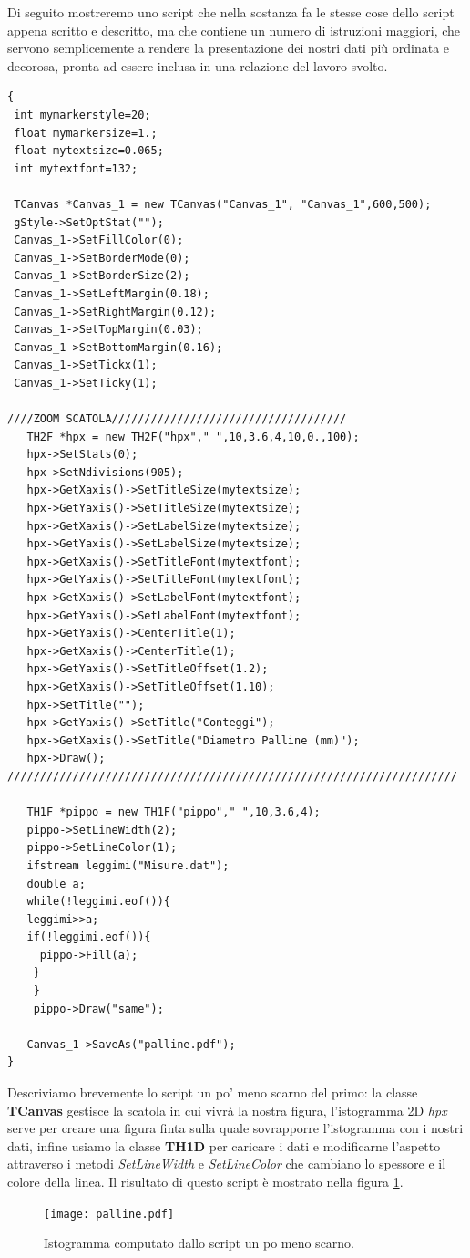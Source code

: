 \documentclass[11pt,fleqn]{book} %
\begin{document}
Di seguito mostreremo uno script che nella sostanza fa le stesse cose dello script appena scritto e descritto, ma che contiene un numero di istruzioni maggiori, che servono semplicemente a rendere la presentazione dei nostri dati più ordinata e decorosa, pronta ad essere inclusa in una relazione del lavoro svolto.
\begin{verbatim}
{
 int mymarkerstyle=20;
 float mymarkersize=1.;
 float mytextsize=0.065;
 int mytextfont=132;

 TCanvas *Canvas_1 = new TCanvas("Canvas_1", "Canvas_1",600,500);
 gStyle->SetOptStat("");
 Canvas_1->SetFillColor(0);
 Canvas_1->SetBorderMode(0);
 Canvas_1->SetBorderSize(2);
 Canvas_1->SetLeftMargin(0.18);
 Canvas_1->SetRightMargin(0.12);
 Canvas_1->SetTopMargin(0.03);
 Canvas_1->SetBottomMargin(0.16);
 Canvas_1->SetTickx(1);
 Canvas_1->SetTicky(1);
 
////ZOOM SCATOLA////////////////////////////////////
   TH2F *hpx = new TH2F("hpx"," ",10,3.6,4,10,0.,100);
   hpx->SetStats(0);
   hpx->SetNdivisions(905);
   hpx->GetXaxis()->SetTitleSize(mytextsize);
   hpx->GetYaxis()->SetTitleSize(mytextsize);
   hpx->GetXaxis()->SetLabelSize(mytextsize);
   hpx->GetYaxis()->SetLabelSize(mytextsize);
   hpx->GetXaxis()->SetTitleFont(mytextfont);
   hpx->GetYaxis()->SetTitleFont(mytextfont);
   hpx->GetXaxis()->SetLabelFont(mytextfont);
   hpx->GetYaxis()->SetLabelFont(mytextfont);
   hpx->GetYaxis()->CenterTitle(1);
   hpx->GetXaxis()->CenterTitle(1);
   hpx->GetYaxis()->SetTitleOffset(1.2);
   hpx->GetXaxis()->SetTitleOffset(1.10);
   hpx->SetTitle("");
   hpx->GetYaxis()->SetTitle("Conteggi");
   hpx->GetXaxis()->SetTitle("Diametro Palline (mm)");
   hpx->Draw();
/////////////////////////////////////////////////////////////////////

   TH1F *pippo = new TH1F("pippo"," ",10,3.6,4);
   pippo->SetLineWidth(2);
   pippo->SetLineColor(1);
   ifstream leggimi("Misure.dat");
   double a;
   while(!leggimi.eof()){
   leggimi>>a;
   if(!leggimi.eof()){
     pippo->Fill(a);
    }
    }
    pippo->Draw("same");

   Canvas_1->SaveAs("palline.pdf");
}
\end{verbatim}
Descriviamo brevemente lo script un po' meno scarno del primo:
la classe \textbf{TCanvas} gestisce la scatola in cui vivrà la nostra figura, l'istogramma 2D \textit{hpx} serve per creare una figura finta sulla quale sovrapporre l'istogramma con i nostri dati, infine usiamo la classe \textbf{TH1D} per caricare i dati e modificarne l'aspetto attraverso i metodi \textit{SetLineWidth} e \textit{SetLineColor} che cambiano lo spessore e il colore della linea. Il risultato di questo script è mostrato nella figura \ref{menogrezzo}.
\begin{figure}
\centering
\texttt{[image: palline.pdf]}
\caption{Istogramma computato dallo script un po meno scarno.\label{menogrezzo}}
\end{figure}
\end{document}
